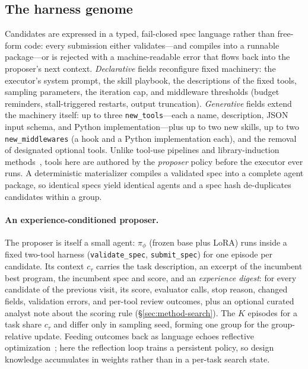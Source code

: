 \subsection{The harness genome}
\label{sec:method-genome}
Candidates are expressed in a typed, fail-closed spec language rather than
free-form code: every submission either validates---and compiles into a
runnable package---or is rejected with a machine-readable error that flows
back into the proposer's next context.  \emph{Declarative} fields
reconfigure fixed machinery: the executor's system prompt, the skill
playbook, the descriptions of the fixed tools, sampling parameters, the
iteration cap, and middleware thresholds (budget reminders, stall-triggered
restarts, output truncation).  \emph{Generative} fields extend the machinery
itself: up to three \texttt{new\_tools}---each a name, description, JSON
input schema, and Python implementation---plus up to two new skills, up to two
\texttt{new\_middlewares} (a hook and a Python implementation each), and the
removal of designated optional tools.  Unlike tool-use pipelines and library-induction
methods~\citep{toolformer,toolllm,latm,creator,craft,trove}, tools here are
authored by the \emph{proposer} policy before the executor ever runs.  A
deterministic materializer compiles a validated spec into a complete agent
package, so identical specs yield identical agents and a spec hash
de-duplicates candidates within a group.

\paragraph{An experience-conditioned proposer.}
The proposer is itself a small agent: $\pi_\phi$ (frozen base plus LoRA)
runs inside a fixed two-tool harness (\texttt{validate\_spec},
\texttt{submit\_spec}) for one episode per candidate.  Its context $c_\tau$
carries the task description, an excerpt of the incumbent best program, the
incumbent spec and score, and an \emph{experience digest}: for every
candidate of the previous visit, its score, evaluator calls, stop reason,
changed fields, validation errors, and per-tool review outcomes, plus an
optional curated analyst note about the scoring rule
(\S\ref{sec:method-search}).  The $K$ episodes for a task share $c_\tau$ and differ only in
sampling seed, forming one group for the group-relative update.  Feeding
outcomes back as language echoes reflective
optimization~\citep{reflexion,gepa,trace}; here the reflection loop trains
a persistent policy, so design knowledge accumulates in weights rather than
in a per-task search state.

